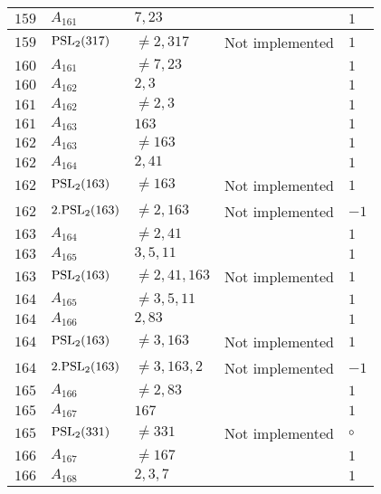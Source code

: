 \documentclass[a4paper, 11pt]{article}
\begin{document}
\begin{longtable}{lllll}
        $ 159 $ & $ A_{161} $ & $ 7, 23 $ & $ ~ $ & $ 1  $ \\ \hline
        $ 159 $ & $ {\rm PSL}_{2}(317) $ & $ \neq 2, 317 $ & Not implemented & $ 1  $ \\ \hline
        $ 160 $ & $ A_{161} $ & $ \neq 7, 23 $ & $ ~ $ & $ 1  $ \\ \hline
        $ 160 $ & $ A_{162} $ & $ 2, 3 $ & $ ~ $ & $ 1  $ \\ \hline
        $ 161 $ & $ A_{162} $ & $ \neq 2, 3 $ & $ ~ $ & $ 1  $ \\ \hline
        $ 161 $ & $ A_{163} $ & $ 163 $ & $ ~ $ & $ 1  $ \\ \hline
        $ 162 $ & $ A_{163} $ & $ \neq 163 $ & $ ~ $ & $ 1  $ \\ \hline
        $ 162 $ & $ A_{164} $ & $ 2, 41 $ & $ ~ $ & $ 1  $ \\ \hline
        $ 162 $ & $ {\rm PSL}_{2}(163) $ & $ \neq 163 $ & Not implemented & $ 1  $ \\ \hline
        $ 162 $ & $ 2.{\rm PSL}_{2}(163) $ & $ \neq 2, 163 $ & Not implemented & $ -1  $ \\ \hline
        $ 163 $ & $ A_{164} $ & $ \neq 2, 41 $ & $ ~ $ & $ 1  $ \\ \hline
        $ 163 $ & $ A_{165} $ & $ 3, 5, 11 $ & $ ~ $ & $ 1  $ \\ \hline
        $ 163 $ & $ {\rm PSL}_{2}(163) $ & $ \neq 2, 41, 163 $ & Not implemented & $ 1  $ \\ \hline
        $ 164 $ & $ A_{165} $ & $ \neq 3, 5, 11 $ & $ ~ $ & $ 1  $ \\ \hline
        $ 164 $ & $ A_{166} $ & $ 2, 83 $ & $ ~ $ & $ 1  $ \\ \hline
        $ 164 $ & $ {\rm PSL}_{2}(163) $ & $ \neq 3, 163 $ & Not implemented & $ 1  $ \\ \hline
        $ 164 $ & $ 2.{\rm PSL}_{2}(163) $ & $ \neq 3, 163, 2 $ & Not implemented & $ -1  $ \\ \hline
        $ 165 $ & $ A_{166} $ & $ \neq 2, 83 $ & $ ~ $ & $ 1  $ \\ \hline
        $ 165 $ & $ A_{167} $ & $ 167 $ & $ ~ $ & $ 1  $ \\ \hline
        $ 165 $ & $ {\rm PSL}_{2}(331) $ & $ \neq 331 $ & Not implemented & $\circ$ \\ \hline
        $ 166 $ & $ A_{167} $ & $ \neq 167 $ & $ ~ $ & $ 1  $ \\ \hline
        $ 166 $ & $ A_{168} $ & $ 2, 3, 7 $ & $ ~ $ & $ 1  $ \\ \hline

\end{longtable}
\end{document}
